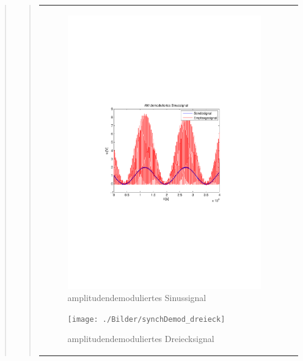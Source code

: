\begin{quote}
\begin{quote}
\begin{center}
\begin{tabular}{ll}
            \hspace{-14em}
                \begin{minipage}{0.6\textwidth}

                    \begin{figure}[H]
                        \label{fig:}
                        \includegraphics[scale=0.5, trim = 2cm 6.5cm 1.5cm
                        8.5cm, clip]{./Bilder/synchDemod_sinus} %
                        \caption{amplitudendemoduliertes Sinussignal}
                    \end{figure}

                \end{minipage}
                \begin{minipage}{0.6\textwidth}

                     \begin{figure}[H]
                        \label{fig:}
                        \texttt{[image: ./Bilder/synchDemod\_dreieck]} %
                        \caption{amplitudendemoduliertes Dreiecksignal}
                    \end{figure}
               \vspace{-1.5em}


\end{minipage}
\end{tabular}
\end{center}
\end{quote}
\end{quote}
